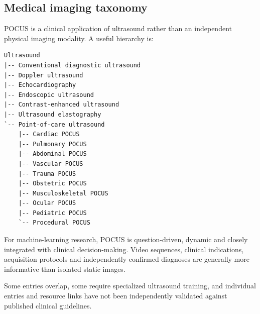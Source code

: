 \subsection{Medical imaging taxonomy}
POCUS is a clinical application of ultrasound rather than an independent physical imaging modality. A useful hierarchy is:

\begin{verbatim}
Ultrasound
|-- Conventional diagnostic ultrasound
|-- Doppler ultrasound
|-- Echocardiography
|-- Endoscopic ultrasound
|-- Contrast-enhanced ultrasound
|-- Ultrasound elastography
`-- Point-of-care ultrasound
    |-- Cardiac POCUS
    |-- Pulmonary POCUS
    |-- Abdominal POCUS
    |-- Vascular POCUS
    |-- Trauma POCUS
    |-- Obstetric POCUS
    |-- Musculoskeletal POCUS
    |-- Ocular POCUS
    |-- Pediatric POCUS
    `-- Procedural POCUS
\end{verbatim}

For machine-learning research, POCUS is question-driven, dynamic and closely integrated with clinical decision-making. Video sequences, clinical indications, acquisition protocols and independently confirmed diagnoses are generally more informative than isolated static images.

 Some entries overlap, some require specialized ultrasound training, and individual entries and resource links have not been independently validated against published clinical guidelines.




